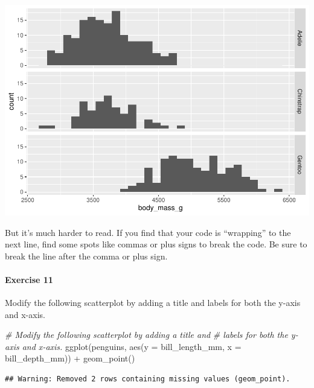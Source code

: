 \documentclass[
]{book}
\newenvironment{Shaded}{\begin{snugshade}}{\end{snugshade}}
\newcommand{\AttributeTok}[1]{\textcolor[rgb]{0.77,0.63,0.00}{#1}}
\newcommand{\CommentTok}[1]{\textcolor[rgb]{0.56,0.35,0.01}{\textit{#1}}}
\newcommand{\FunctionTok}[1]{\textcolor[rgb]{0.00,0.00,0.00}{#1}}
\newcommand{\NormalTok}[1]{#1}
\newcommand{\SpecialCharTok}[1]{\textcolor[rgb]{0.00,0.00,0.00}{#1}}
\begin{document}
\includegraphics{intro_stats_files/figure-latex/unnamed-chunk-116-1.pdf}

But it's much harder to read. If you find that your code is ``wrapping'' to the next line, find some spots like commas or plus signs to break the code. Be sure to break the line after the comma or plus sign.

\hypertarget{exercise-11-1}{%
\paragraph*{Exercise 11}\label{exercise-11-1}}

Modify the following scatterplot by adding a title and labels for both the y-axis and x-axis.

\begin{Shaded}
\begin{Highlighting}[]
\CommentTok{\# Modify the following scatterplot by adding a title and }
\CommentTok{\# labels for both the y{-}axis and x{-}axis.}
\FunctionTok{ggplot}\NormalTok{(penguins, }\FunctionTok{aes}\NormalTok{(}\AttributeTok{y =}\NormalTok{ bill\_length\_mm, }\AttributeTok{x =}\NormalTok{ bill\_depth\_mm)) }\SpecialCharTok{+}
    \FunctionTok{geom\_point}\NormalTok{()}
\end{Highlighting}
\end{Shaded}

\begin{verbatim}
## Warning: Removed 2 rows containing missing values (geom_point).
\end{verbatim}
\end{document}
